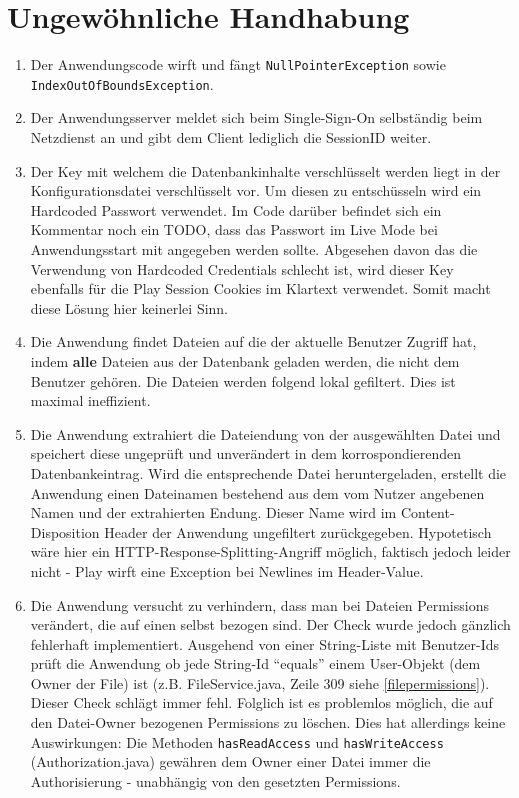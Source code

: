 \documentclass[12pt,DIV14,BCOR10mm,a4paper,parskip=half-,headsepline,headinclude,english,ngerman,bibliography=totocnumbered]{scrreprt}
\begin{document}
\chapter{Ungewöhnliche Handhabung}

\begin{enumerate}
  \item Der Anwendungscode wirft und fängt \texttt{NullPointerException} sowie  \newline \texttt{IndexOutOfBoundsException}.
  \item Der Anwendungsserver meldet sich beim Single-Sign-On selbständig beim Netzdienst an und gibt dem Client lediglich die SessionID weiter.
  \item Der Key mit welchem die Datenbankinhalte verschlüsselt werden liegt in der Konfigurationsdatei verschlüsselt vor. Um diesen zu entschüsseln wird ein Hardcoded Passwort verwendet. Im Code darüber befindet sich ein Kommentar noch ein TODO, dass das Passwort im Live Mode bei Anwendungsstart mit angegeben werden sollte. Abgesehen davon das die Verwendung von Hardcoded Credentials schlecht ist, wird dieser Key ebenfalls für die Play Session Cookies im Klartext verwendet. Somit macht diese Lösung hier keinerlei Sinn.
  \item Die Anwendung findet Dateien auf die der aktuelle Benutzer Zugriff hat, indem \textbf{alle} Dateien aus der Datenbank geladen werden, die nicht dem Benutzer gehören. Die Dateien werden folgend lokal gefiltert. Dies ist maximal ineffizient.
  \item Die Anwendung extrahiert die Dateiendung von der ausgewählten Datei und speichert diese ungeprüft und unverändert in dem korrospondierenden Datenbankeintrag. Wird die entsprechende Datei heruntergeladen, erstellt die Anwendung einen Dateinamen bestehend aus dem vom Nutzer angebenen Namen und der extrahierten Endung. Dieser Name wird im Content-Disposition Header der Anwendung ungefiltert zurückgegeben. Hypotetisch wäre hier ein HTTP-Response-Splitting-Angriff möglich, faktisch jedoch leider nicht - Play wirft eine Exception bei Newlines im Header-Value.
  \item Die Anwendung versucht zu verhindern, dass man bei Dateien Permissions verändert, die auf einen selbst bezogen sind. Der Check wurde jedoch gänzlich fehlerhaft implementiert. Ausgehend von einer String-Liste mit Benutzer-Ids prüft die Anwendung ob jede String-Id \enquote{equals} einem User-Objekt (dem Owner der File) ist (z.B. FileService.java, Zeile 309 siehe \ref{filepermissions}). Dieser Check schlägt immer fehl. Folglich ist es problemlos möglich, die auf den Datei-Owner bezogenen Permissions zu löschen. Dies hat allerdings keine Auswirkungen: Die Methoden \texttt{hasReadAccess} und \texttt{hasWriteAccess} (Authorization.java) gewähren dem Owner einer Datei immer die Authorisierung - unabhängig von den gesetzten Permissions.

\end{enumerate}
\end{document}
